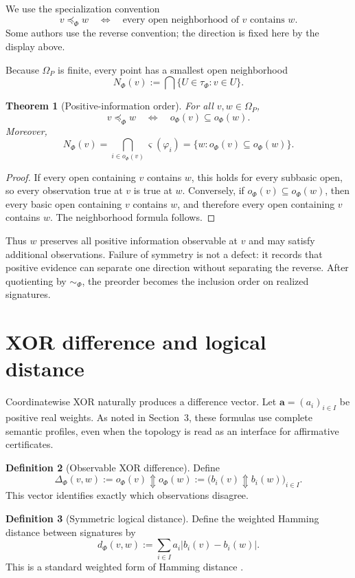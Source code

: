 \documentclass[11pt]{article}
\theoremstyle{definition}
\newtheorem{definition}{Definition}[section]
\theoremstyle{plain}
\newtheorem{theorem}[definition]{Theorem}
\theoremstyle{remark}
\begin{document}
We use the specialization convention
\[
 v\preceq_\Phi w
 \quad\Longleftrightarrow\quad
 \text{every open neighborhood of $v$ contains $w$}.
\]
Some authors use the reverse convention; the direction is fixed here by the
display above.

Because $\Omega_P$ is finite, every point has a smallest open neighborhood
\[
 N_\Phi(v):=\bigcap\{U\in\tau_\Phi:v\in U\}.
\]

\begin{theorem}[Positive-information order]
For all $v,w\in\Omega_P$,
\[
 v\preceq_\Phi w
 \quad\Longleftrightarrow\quad
 o_\Phi(v)\subseteq o_\Phi(w).
\]
Moreover,
\[
 N_\Phi(v)
 =\bigcap_{i\in o_\Phi(v)}\varsigma(\varphi_i)
 =\{w:o_\Phi(v)\subseteq o_\Phi(w)\}.
\]
\end{theorem}

\begin{proof}
If every open containing $v$ contains $w$, this holds for every subbasic open,
so every observation true at $v$ is true at $w$.  Conversely, if
$o_\Phi(v)\subseteq o_\Phi(w)$, then every basic open containing $v$ contains $w$,
and therefore every open containing $v$ contains $w$.  The neighborhood formula
follows.
\end{proof}

Thus $w$ preserves all positive information observable at $v$ and may satisfy
additional observations.  Failure of symmetry is not a defect: it records that
positive evidence can separate one direction without separating the reverse.
After quotienting by $\sim_\Phi$, the preorder becomes the inclusion order on
realized signatures.

\section{XOR difference and logical distance}

Coordinatewise XOR naturally produces a difference vector.  Let
$\mathbf a=(a_i)_{i\in I}$ be positive real weights.  As noted in Section~3,
these formulas use complete semantic profiles, even when the topology is read as
an interface for affirmative certificates.

\begin{definition}[Observable XOR difference]
Define
\[
 \Delta_\Phi(v,w)
 :=o_\Phi(v)\Updownarrow o_\Phi(w)
 :=\bigl(b_i(v)\Updownarrow b_i(w)\bigr)_{i\in I}.
\]
This vector identifies exactly which observations disagree.
\end{definition}

\begin{definition}[Symmetric logical distance]
Define the weighted Hamming distance between signatures by
\[
 d_\Phi(v,w)
 :=\sum_{i\in I} a_i\lvert b_i(v)-b_i(w)\rvert.
\]
This is a standard weighted form of Hamming distance \cite{Hamming1950}.
\end{definition}
\end{document}
